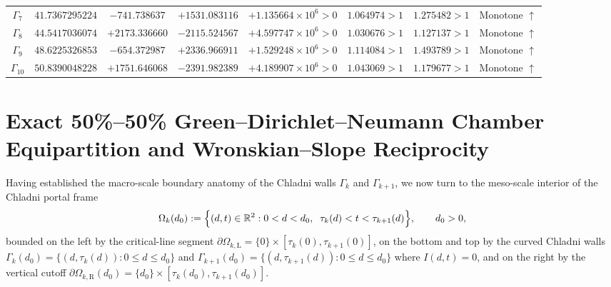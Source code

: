 \documentclass[11pt,reqno]{amsart}
\theoremstyle{definition}
\theoremstyle{remark}
\numberwithin{equation}{section}
\begin{document}
\begin{table}[htbp]
\begin{tabular}{@{}cccccccc@{}}
$\Gamma_7$ & $41.7367295224$ & $-741.738637$ & $+1531.083116$ & $+1.135664 \times 10^6 > 0$ & $1.064974 > 1$ & $1.275482 > 1$ & Monotone $\uparrow$ \\
$\Gamma_8$ & $44.5417036074$ & $+2173.336660$ & $-2115.524567$ & $+4.597747 \times 10^6 > 0$ & $1.030676 > 1$ & $1.127137 > 1$ & Monotone $\uparrow$ \\
$\Gamma_9$ & $48.6225326853$ & $-654.372987$ & $+2336.966911$ & $+1.529248 \times 10^6 > 0$ & $1.114084 > 1$ & $1.493789 > 1$ & Monotone $\uparrow$ \\
$\Gamma_{10}$ & $50.8390048228$ & $+1751.646068$ & $-2391.982389$ & $+4.189907 \times 10^6 > 0$ & $1.043069 > 1$ & $1.179677 > 1$ & Monotone $\uparrow$ \\
\bottomrule
\end{tabular}
\end{table}

\section{Exact 50\%--50\% Green--Dirichlet--Neumann Chamber Equipartition and Wronskian--Slope Reciprocity}\label{sec:meso}

Having established the macro-scale boundary anatomy of the Chladni walls $\Gamma_k$ and $\Gamma_{k+1}$, we now turn to the meso-scale interior of the Chladni portal frame
\begin{equation}\label{eq:chamber-def}
\Omega_k(d_0) := \Bigl\{(d,t) \in \mathbb{R}^2 : 0 < d < d_0,\;\; \tau_k(d) < t < \tau_{k+1}(d)\Bigr\}, \qquad d_0 > 0,
\end{equation}
bounded on the left by the critical-line segment $\partial\Omega_{k,\mathrm{L}} = \{0\} \times [\tau_k(0),\tau_{k+1}(0)]$, on the bottom and top by the curved Chladni walls $\Gamma_k(d_0) = \{(d,\tau_k(d)) : 0 \le d \le d_0\}$ and $\Gamma_{k+1}(d_0) = \{(d,\tau_{k+1}(d)) : 0 \le d \le d_0\}$ where $I(d,t)=0$, and on the right by the vertical cutoff $\partial\Omega_{k,\mathrm{R}}(d_0) = \{d_0\} \times [\tau_k(d_0),\tau_{k+1}(d_0)]$.
\end{document}
